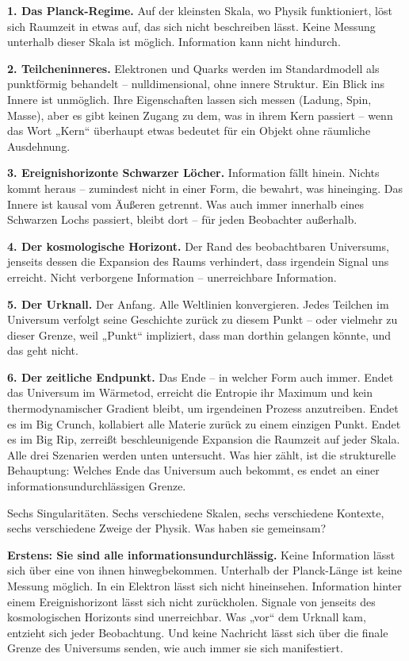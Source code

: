 \documentclass[11pt, twoside, openright]{book}
\begin{document}
\textbf{1. Das Planck-Regime.} Auf der kleinsten Skala, wo Physik funktioniert, löst sich Raumzeit in etwas auf, das sich nicht beschreiben lässt. Keine Messung unterhalb dieser Skala ist möglich. Information kann nicht hindurch.

\textbf{2. Teilcheninneres.} Elektronen und Quarks werden im Standardmodell als punktförmig behandelt -- nulldimensional, ohne innere Struktur. Ein Blick ins Innere ist unmöglich. Ihre Eigenschaften lassen sich messen (Ladung, Spin, Masse), aber es gibt keinen Zugang zu dem, was in ihrem Kern passiert -- wenn das Wort „Kern“ überhaupt etwas bedeutet für ein Objekt ohne räumliche Ausdehnung.

\textbf{3. Ereignishorizonte Schwarzer Löcher.} Information fällt hinein. Nichts kommt heraus -- zumindest nicht in einer Form, die bewahrt, was hineinging. Das Innere ist kausal vom Äußeren getrennt. Was auch immer innerhalb eines Schwarzen Lochs passiert, bleibt dort -- für jeden Beobachter außerhalb.

\textbf{4. Der kosmologische Horizont.} Der Rand des beobachtbaren Universums, jenseits dessen die Expansion des Raums verhindert, dass irgendein Signal uns erreicht. Nicht verborgene Information -- unerreichbare Information.

\textbf{5. Der Urknall.} Der Anfang. Alle Weltlinien konvergieren. Jedes Teilchen im Universum verfolgt seine Geschichte zurück zu diesem Punkt -- oder vielmehr zu dieser Grenze, weil „Punkt“ impliziert, dass man dorthin gelangen könnte, und das geht nicht.

\textbf{6. Der zeitliche Endpunkt.} Das Ende -- in welcher Form auch immer. Endet das Universum im Wärmetod, erreicht die Entropie ihr Maximum und kein thermodynamischer Gradient bleibt, um irgendeinen Prozess anzutreiben. Endet es im Big Crunch, kollabiert alle Materie zurück zu einem einzigen Punkt. Endet es im Big Rip, zerreißt beschleunigende Expansion die Raumzeit auf jeder Skala. Alle drei Szenarien werden unten untersucht. Was hier zählt, ist die strukturelle Behauptung: Welches Ende das Universum auch bekommt, es endet an einer informationsundurchlässigen Grenze.

Sechs Singularitäten. Sechs verschiedene Skalen, sechs verschiedene Kontexte, sechs verschiedene Zweige der Physik. Was haben sie gemeinsam?

\textbf{Erstens: Sie sind alle informationsundurchlässig.} Keine Information lässt sich über eine von ihnen hinwegbekommen. Unterhalb der Planck-Länge ist keine Messung möglich. In ein Elektron lässt sich nicht hineinsehen. Information hinter einem Ereignishorizont lässt sich nicht zurückholen. Signale von jenseits des kosmologischen Horizonts sind unerreichbar. Was „vor“ dem Urknall kam, entzieht sich jeder Beobachtung. Und keine Nachricht lässt sich über die finale Grenze des Universums senden, wie auch immer sie sich manifestiert.
\end{document}

